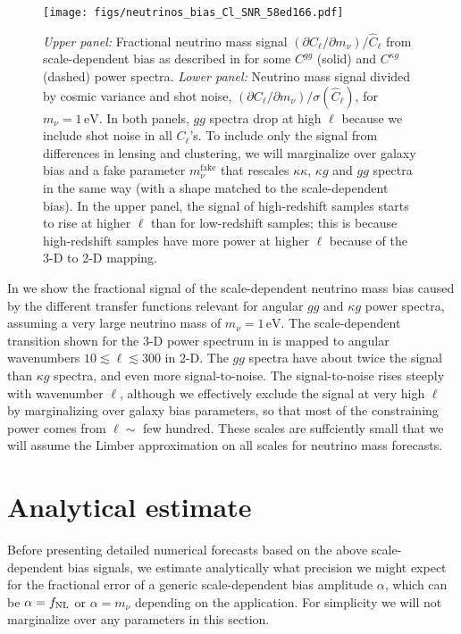 \documentclass[prd,superscriptaddress,floatfix,notitlepage,nofootinbib,reprint]{revtex4-1} %
\begin{document}
\begin{figure}[tbp]
\texttt{[image: figs/neutrinos\_bias\_Cl\_SNR\_58ed166.pdf]}
\caption{\emph{Upper panel:} Fractional neutrino mass signal $(\partial C_\ell/\partial m_\nu)/\hat C_\ell$ from scale-dependent bias as described in  for some $C^{gg}$ (solid) and $C^{\kappa g}$ (dashed) power spectra.
\emph{Lower panel:} Neutrino mass signal divided by cosmic variance and shot noise, $(\partial C_\ell/\partial m_\nu)/\sigma(\hat C_\ell)$, for $m_\nu=1\,\mathrm{eV}$.
In both panels, $gg$ spectra drop at high $\ell$ because we include shot noise in all $C_\ell$'s.
To include only the signal from differences in lensing and clustering, we will marginalize over galaxy bias and a fake parameter $m_\nu^\mathrm{fake}$ that rescales $\kappa\kappa$, $\kappa g$ and $gg$ spectra in the same way (with a shape matched to the scale-dependent bias).
In the upper panel, the signal of high-redshift samples starts to rise at higher $\ell$ than for low-redshift samples; this is because high-redshift samples have more power at higher $\ell$ because of the 3-D to 2-D mapping.
}
\label{fig:mnuSignalNoise}
\end{figure}

In  we show the fractional signal of the scale-dependent neutrino mass bias caused by the different transfer functions relevant for angular $gg$ and $\kappa g$ power spectra, assuming a very large neutrino mass of $m_\nu=1\,\mathrm{eV}$.
The scale-dependent transition shown for the 3-D power spectrum in  is mapped to angular wavenumbers $10\lesssim \ell\lesssim 300$ in 2-D.
The $gg$ spectra have about twice the signal than $\kappa g$ spectra, and even more signal-to-noise.
The signal-to-noise rises steeply with wavenumber $\ell$, although we effectively exclude the signal at very high $\ell$ by marginalizing over galaxy bias parameters, so that most of the constraining power comes from $\ell\sim $ few hundred.
These scales are suffciently small that we will assume the Limber approximation on all scales for neutrino mass forecasts.



\section{Analytical estimate}

\label{se:AnalyticalSVCFisher}

Before presenting detailed numerical forecasts based on the above scale-dependent bias signals, we estimate analytically what precision we might expect for the fractional error of a generic scale-dependent bias amplitude $\alpha$, which can be $\alpha={f_\mathrm{NL}}$ or $\alpha=m_\nu$ depending on the application.
For simplicity we will not marginalize over any parameters in this section.
\end{document}
